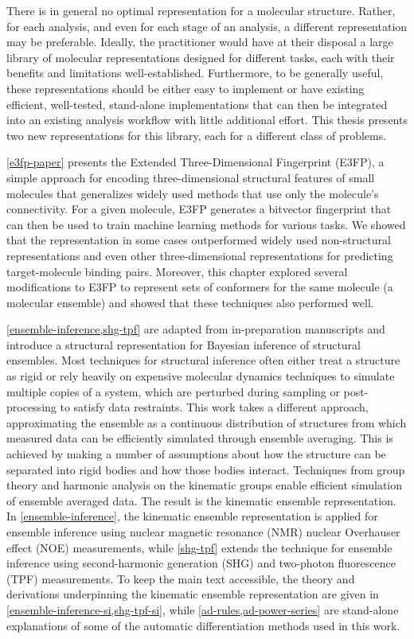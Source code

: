 There is in general no optimal representation for a molecular structure.
Rather, for each analysis, and even for each stage of an analysis, a different representation may be preferable.
Ideally, the practitioner would have at their disposal a large library of molecular representations designed for different tasks, each with their benefits and limitations well-established.
Furthermore, to be generally useful, these representations should be either easy to implement or have existing efficient, well-tested, stand-alone implementations that can then be integrated into an existing analysis workflow with little additional effort.
This thesis presents two new representations for this library, each for a different class of problems.

\cref{e3fp-paper} presents the Extended Three-Dimensional Fingerprint (E3FP), a simple approach for encoding three-dimensional structural features of small molecules that generalizes widely used methods that use only the molecule's connectivity.
For a given molecule, E3FP generates a bitvector fingerprint that can then be used to train machine learning methods for various tasks.
We showed that the representation in some cases outperformed widely used non-structural representations and even other three-dimensional representations for predicting target-molecule binding pairs.
Moreover, this chapter explored several modifications to E3FP to represent sets of conformers for the same molecule (\ie a molecular ensemble) and showed that these techniques also performed well.

\cref{ensemble-inference,shg-tpf} are adapted from in-preparation manuscripts and introduce a structural representation for Bayesian inference of structural ensembles.
Most techniques for structural inference often either treat a structure as rigid or rely heavily on expensive molecular dynamics techniques to simulate multiple copies of a system, which are perturbed during sampling or post-processing to satisfy data restraints.
This work takes a different approach, approximating the ensemble as a continuous distribution of structures from which measured data can be efficiently simulated through ensemble averaging.
This is achieved by making a number of assumptions about how the structure can be separated into rigid bodies and how those bodies interact.
Techniques from group theory and harmonic analysis on the kinematic groups enable efficient simulation of ensemble averaged data.
The result is the kinematic ensemble representation.
In \cref{ensemble-inference}, the kinematic ensemble representation is applied for ensemble inference using nuclear magnetic resonance (NMR) nuclear Overhauser effect (NOE) measurements, while \cref{shg-tpf} extends the technique for ensemble inference using second-harmonic generation (SHG) and two-photon fluorescence (TPF) measurements.
To keep the main text accessible, the theory and derivations underpinning the kinematic ensemble representation are given in \cref{ensemble-inference-si,shg-tpf-si}, while \cref{ad-rules,ad-power-series} are stand-alone explanations of some of the automatic differentiation methods used in this work.

